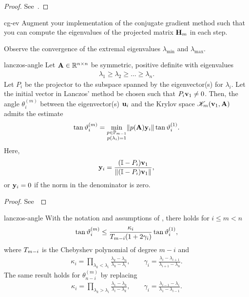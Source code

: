 \begin{proof}
  See~\cite[Section 6.7.3]{Saad00}.
\end{proof}

\begin{Problem}{cg-ev}
  Augment your implementation of the conjugate gradient method such
  that you can compute the eigenvalues of the projected matrix
  $\mathbf H_m$ in each step.

  Observe the convergence of the extremal eigenvalues $\lambda_{\text{min}}$
  and $\lambda_{\text{max}}$.
\end{Problem}

\begin{Lemma}{lanczos-angle}
  Let $\mathbf A\in\mathbb R^{n\times n}$ be symmetric, positive definite with eigenvalues
  \begin{gather}
    \lambda_1 \ge \lambda_2 \ge \dots \ge \lambda_n.
  \end{gather}
  Let $P_i$ be the projector to the subspace spanned by the
  eigenvector(s) for $\lambda_i$. Let the initial vector in Lanczos'
  method be chosen such that $P_i \mathbf v_1\neq 0$. Then, the angle
  $\theta_i^{(m)}$ between the eigenvector(s) $\mathbf u_i$ and the Krylov space
  $\mathscr K_m(\mathbf v_1,\mathbf A)$ admits the estimate
  \begin{gather}
    \tan\vartheta_i^{(m)} = \min_{\substack{p\in\mathbb P_{m-1}\\p(\lambda_i)=1}} \lVert p(\mathbf A)\mathbf y_i\rVert \tan \vartheta_i^{(1)}.
  \end{gather}
  Here,
  \begin{gather}
    \mathbf y_i = \frac{(\mathbb I-P_i)\mathbf v_1}{\lVert(\mathbb I-P_i)\mathbf v_1\rVert},
  \end{gather}
  or $\mathbf y_i=0$ if the norm in the denominator is zero.
\end{Lemma}

\begin{proof}
  See~\cite[Lemma 6.1]{Saad11}
\end{proof}

\begin{Theorem}{lanczos-angle}
  With the notation and assumptions of , there holds for $i\le m < n$
  \begin{gather}
    \tan\vartheta_i^{(m)} \le \frac{\kappa_i}{T_{m-i}(1+2\gamma_i)}\tan\vartheta_i^{(1)},
  \end{gather}
  where $T_{m-i}$ is the Chebyshev polynomial of degree $m-i$ and
  \begin{gather}
    \kappa_i=\prod_{\lambda_k < \lambda_i} \frac{\lambda_k-\lambda_n}{\lambda_k-\lambda_i},
    \qquad \gamma_i = \frac{\lambda_{i}-\lambda_{i+1}}{\lambda_{i+1}-\lambda_{n}}.
  \end{gather}
  The same result holds for $\theta_{n-i}^{(m)}$ by replacing
  \begin{gather}
    \kappa_i=\prod_{\lambda_k > \lambda_i} \frac{\lambda_1-\lambda_k}{\lambda_i-\lambda_k},
    \qquad \gamma_i = \frac{\lambda_{i-1}-\lambda_{i}}{\lambda_{1}-\lambda_{i-1}}.
  \end{gather}  
\end{Theorem}

